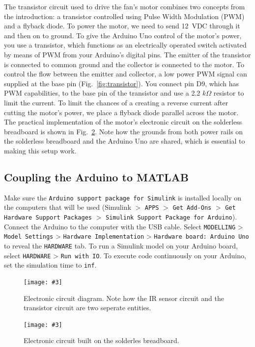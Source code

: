 \documentclass[10pt,twoside,openright]{article}
\newcommand{\mijnfiguur}[5][ht]{            %
    \begin{figure}[#1]                      %
        \begin{center}                      %
            \texttt{[image: \#3]}        %
        \end{center}
        \caption{#4\label{#5}}          %
    \end{figure}
    }
\begin{document}
The transistor circuit used to drive the fan's motor combines two concepts from the introduction: a transistor controlled using Pulse Width Modulation (PWM) and a flyback diode. To power the motor, we need to send 12~VDC through it and then on to ground. To give the Arduino Uno control of the motor’s power, you use a transistor, which functions as an electrically operated switch activated by means of PWM from your Arduino’s digital pins. The emitter of the transistor is connected to common ground and the collector is connected to the motor. To control the flow between the emitter and collector, a low power PWM signal can supplied at the base pin (Fig.~\ref{fig:transistor}). You connect pin D9, which has PWM capabilities, to the base pin of the transistor and use a 2.2 $k \Omega$ resistor to limit the current. To limit the chances of a creating a reverse current after cutting the motor's power, we place a flyback diode parallel across the motor. The practical implementation of the motor's electronic circuit on the solderless breadboard is shown in Fig.~\ref{fig:fritzing}. Note how the grounds from both power rails on the solderless breadboard and the Arduino Uno are shared, which is essential to making this setup work.

\subsection{Coupling the Arduino to MATLAB}
Make sure the \texttt{Arduino support package for Simulink} is installed locally on the computers that will be used (Simulink $>$ \texttt{APPS} $>$ \texttt{Get Add-Ons} $>$ \texttt{Get Hardware Support Packages} $>$ \texttt{Simulink Support Package for Arduino}). Connect the Arduino to the computer with the USB cable. Select \texttt{MODELLING} > \texttt{Model Settings} > \texttt{Hardware Implementation} > \texttt{Hardware board: Arduino Uno} to reveal the \texttt{HARDWARE} tab. To run a Simulink model on your Arduino board, select \texttt{HARDWARE} > \texttt{Run with IO}. To execute code continuously on your Arduino, set the simulation time to \texttt{inf}.

\begin{landscape}
\mijnfiguur[h!]{scale=1.4}{circuit.pdf}{Electronic circuit diagram. Note how the IR sensor circuit and the transistor circuit are two seperate entities.}{fig:circuit}
\end{landscape}

\begin{landscape}
\mijnfiguur[h!]{scale=0.8}{levitatingPingPongCircuit_bb.pdf}{Electronic circuit built on the solderles breadboard.}{fig:fritzing}
\end{landscape}
\end{document}
